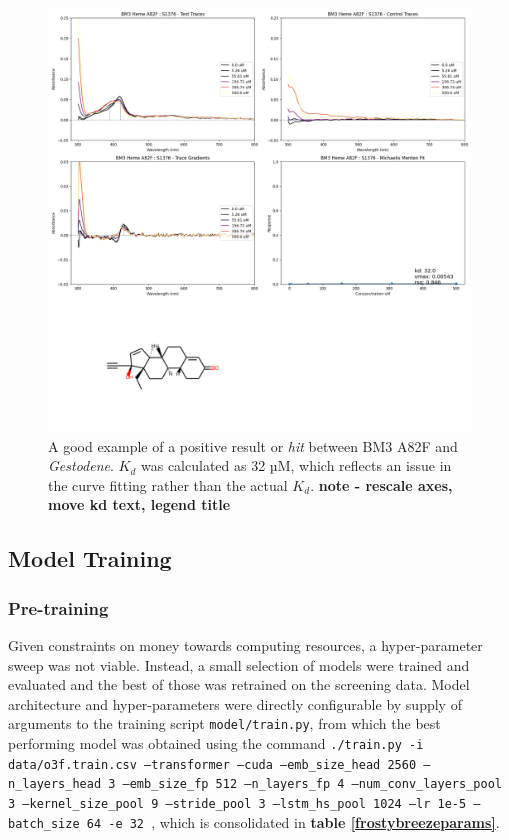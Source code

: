 \documentclass[16pt]{book}
\begin{document}
\begin{figure}
	\caption{\label{screeninghit} A good example of a positive result or \textit{hit} between BM3 A82F and \textit{Gestodene}. $K_d$ was calculated as 32 µM, which reflects an issue in the curve fitting rather than the actual $K_d$. \textbf{note - rescale axes, move kd text, legend title}}
	\includegraphics[width = \textwidth]{img/BM3-Heme-A82F:S1376.png}
\end{figure}

\subsection{Model Training}

\subsubsection{Pre-training}

Given constraints on money towards computing resources, a hyper-parameter sweep was not viable.
Instead, a small selection of models were trained and evaluated and the best of those was retrained on the screening data.
Model architecture and hyper-parameters were directly configurable by supply of arguments to the training script \texttt{model/train.py}, from which the best performing model was obtained using the command \texttt{./train.py -i data/o3f.train.csv --transformer --cuda --emb\_size\_head 2560 --n\_layers\_head 3 --emb\_size\_fp 512 --n\_layers\_fp 4 --num\_conv\_layers\_pool 3 --kernel\_size\_pool 9 --stride\_pool 3 --lstm\_hs\_pool 1024 --lr 1e-5 --batch\_size 64 -e 32
}, which is consolidated in \textbf{table \ref{frostybreezeparams}}.
\end{document}
